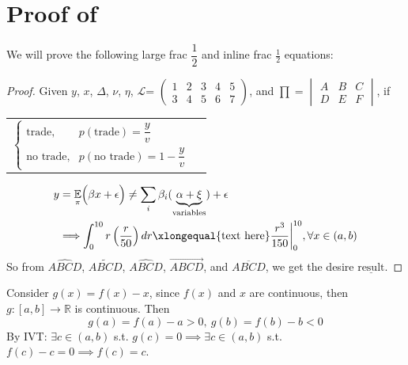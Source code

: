 \documentclass[letterpaper]{article}
\newcommand{\E}{\mathbb{E}}
\begin{document}
\section{Proof of }

We will prove the following large frac $\dfrac{1}{2}$ and inline frac $\tfrac{1}{2}$ equations:
\begin{proof}

  Given $y$, $x$, $\Delta$, $\nu$, $\eta$, $\mathcal{L}$=
  $\begin{pmatrix}
  1 & 2 & 3 & 4 & 5 \\
  3 & 4 & 5 & 6 & 7
  \end{pmatrix}$,
  and $\prod=\begin{vmatrix}
  A &B  &C \\
  D&  E& F
  \end{vmatrix}$, if

  \begin{center}
    \begin{tabular}{ll}
      $\begin{cases}
      \text{trade}, & p(\text{trade})=\dfrac{y}{v}\\
      \text{no trade}, & p(\text{no trade})=1-\dfrac{y}{v}
      \end{cases}$
    \end{tabular}
  \end{center}
  
  \vspace*{-1cm}

  \begin{align}\label{myEquation}
    \nonumber y&=\underset{\pi}{\E}\Big(\beta x + \epsilon\Big)\neq\sum\limits_{i}\beta_i(\underbrace{\alpha+\xi}_{\text{variables}}) + \epsilon\\
    &\Longrightarrow \int_{0}^{10}r \left( \dfrac{r}{50} \right)dr\xlongequal{\text{text here}}\dfrac{r^{3}}{150}\biggr\rvert^{10}_{0}, \forall x\in (a,b)
  \end{align}
  So from $\widehat{ABCD}$, $\widetilde{ABCD}$, $\widehat{ABCD}$, $\overrightarrow{ABCD}$, and $\overline{ABCD}$, we get the desire $\underline{\text{result}}$.
\end{proof}

\begin{framed}
  Consider $g(x)=f(x)-x$, since $f(x)$ and $x$ are continuous, then $g:[a,b]\to\mathbb{R}$ is continuous. Then
  $$g(a)=f(a)-a>0, \ g(b)=f(b)-b<0$$
  By IVT: $\exists c\in(a,b)$ s.t. $g(c)=0\implies \exists c\in(a,b)$ s.t. $f(c)-c=0\implies f(c)=c.$
\end{framed}
\end{document}
